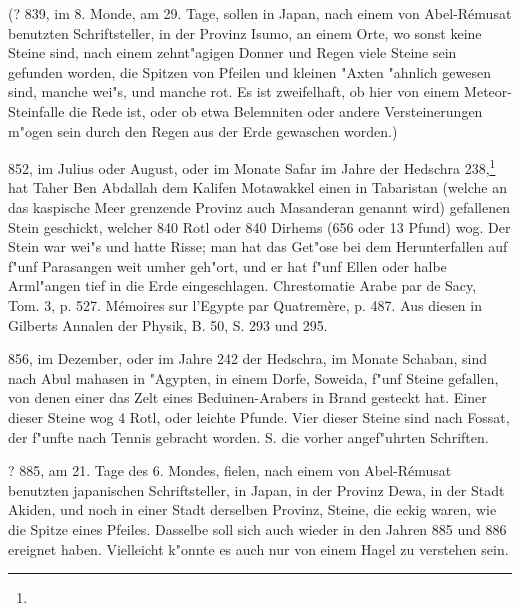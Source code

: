 \documentclass[a4paper, 11pt, oneside, polutonikogreek, german]{article}
\begin{document}
(? 839, im 8. Monde, am 29. Tage, sollen in Japan, nach einem von Abel-Rémusat benutzten Schriftsteller, in der Provinz Isumo, an einem Orte, wo sonst keine Steine sind, nach einem zehnt"agigen Donner und Regen viele Steine sein gefunden worden, die Spitzen von Pfeilen und kleinen "Axten "ahnlich gewesen sind, manche wei"s, und manche rot. Es ist zweifelhaft, ob hier von einem Meteor-Steinfalle die Rede ist, oder ob etwa Belemniten oder andere Versteinerungen m"ogen sein durch den Regen aus der Erde gewaschen worden.)

852, im Julius oder August, oder im Monate Safar im Jahre der Hedschra 238,\footnote{} hat Taher Ben Abdallah dem Kalifen Motawakkel einen in Tabaristan (welche an das kaspische Meer grenzende Provinz auch Masanderan genannt wird) gefallenen Stein geschickt, welcher 840 Rotl oder 840 Dirhems (656 oder 13 Pfund) wog. Der Stein war wei"s und hatte Risse; man hat das Get"ose bei dem Herunterfallen auf f"unf Parasangen weit umher geh"ort, und er hat f"unf Ellen oder halbe Arml"angen tief in die Erde eingeschlagen. Chrestomatie Arabe par de Sacy, Tom. 3, p. 527. Mémoires sur l'Egypte par Quatremère, p. 487. Aus diesen in Gilberts Annalen der Physik, B. 50, S. 293 und 295.

856, im Dezember, oder im Jahre 242 der Hedschra, im Monate Schaban, sind nach Abul mahasen in "Agypten, in einem Dorfe, Soweida, f"unf Steine gefallen, von denen einer das Zelt eines Beduinen-Arabers in Brand gesteckt hat. Einer dieser Steine wog 4 Rotl, oder leichte Pfunde. Vier dieser Steine sind nach Fossat, der f"unfte nach Tennis gebracht worden. S. die vorher angef"uhrten Schriften.

? 885, am 21. Tage des 6. Mondes, fielen, nach einem von Abel-Rémusat benutzten japanischen Schriftsteller, in Japan, in der Provinz Dewa, in der Stadt Akiden, und noch in einer Stadt derselben Provinz, Steine, die eckig waren, wie die Spitze eines Pfeiles. Dasselbe soll sich auch wieder in den Jahren 885 und 886 ereignet haben. Vielleicht k"onnte es auch nur von einem Hagel zu verstehen sein.
\end{document}
